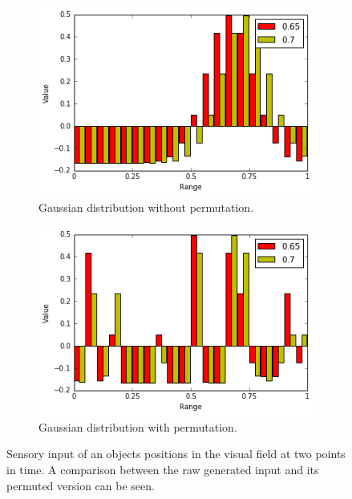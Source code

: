 \documentclass[conference]{IEEEtran}
\begin{document}
		\begin{figure}[th!]
			\begin{subfigure}{0.45\columnwidth}
				\center
				\includegraphics[width=1\columnwidth]{img/gaussianbar.png}
				\caption{Gaussian distribution without permutation.}
				\label{fig:gaussianbar}
			\end{subfigure}
			\begin{subfigure}{0.45\columnwidth}
				\center
				\includegraphics[width=1\columnwidth]{img/gaussianbarperm.png}
				\caption{Gaussian distribution with permutation.
				}
				\label{fig:gaussianbarperm}
			\end{subfigure}	
		\caption{Sensory input of an objects positions in the visual field at two points in time. A comparison between the raw generated input and its permuted version can be seen.}
		\label{gaussian}
		\end{figure}	
\end{document}
